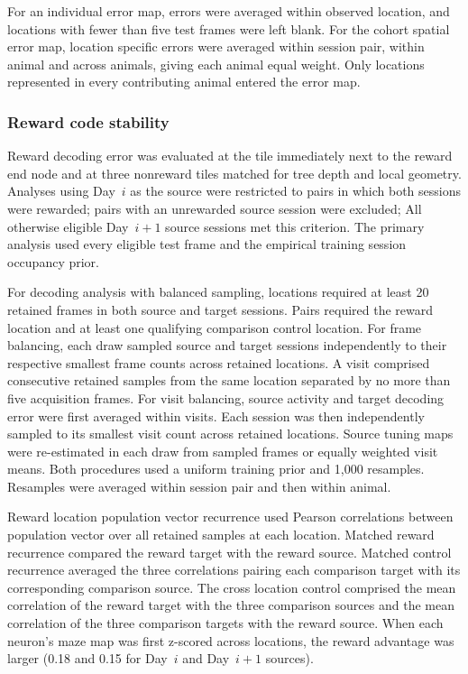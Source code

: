 \documentclass[fleqn,10pt]{wlscirep}
\begin{document}
For an individual error map, errors were averaged within observed location, and locations with fewer than five test frames were left blank. For the cohort spatial error map, location specific errors were averaged within session pair, within animal and across animals, giving each animal equal weight. Only locations represented in every contributing animal entered the error map.

\subsubsection*{Reward code stability}

Reward decoding error was evaluated at the tile immediately next to the reward end node and at three nonreward tiles matched for tree depth and local geometry. Analyses using Day~$i$ as the source were restricted to pairs in which both sessions were rewarded; pairs with an unrewarded source session were excluded; All otherwise eligible Day~$i+1$ source sessions met this criterion. The primary analysis used every eligible test frame and the empirical training session occupancy prior. 

For decoding analysis with balanced sampling, locations required at least 20 retained frames in both source and target sessions. Pairs required the reward location and at least one qualifying comparison control location. For frame balancing, each draw sampled source and target sessions independently to their respective smallest frame counts across retained locations. A visit comprised consecutive retained samples from the same location separated by no more than five acquisition frames. For visit balancing, source activity and target decoding error were first averaged within visits. Each session was then independently sampled to its smallest visit count across retained locations. Source tuning maps were re-estimated in each draw from sampled frames or equally weighted visit means. Both procedures used a uniform training prior and 1,000 resamples. Resamples were averaged within session pair and then within animal.

Reward location population vector recurrence used Pearson correlations between population vector over all retained samples at each location. Matched reward recurrence compared the reward target with the reward source. Matched control recurrence averaged the three correlations pairing each comparison target with its corresponding comparison source. The cross location control comprised the mean correlation of the reward target with the three comparison sources and the mean correlation of the three comparison targets with the reward source. When each neuron's maze map was first z-scored across locations, the reward advantage was larger (0.18 and 0.15 for Day~$i$ and Day~$i+1$ sources). 
\end{document}

